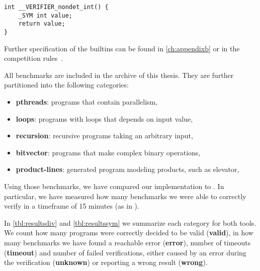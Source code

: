 \begin{verbatim}
int __VERIFIER_nondet_int() {
    _SYM int value;
    return value;
}
\end{verbatim}
Further specification of the \svcomp builtins can be found in
\autoref{ch:appendixb} or in the competition rules~\cite{svcomp}.

All benchmarks are included in the archive of this thesis. They are further
partitioned into the following categories:
\begin{itemize}
    \item \textbf{pthreads}: programs that contain parallelism,
    \item \textbf{loops}: programs with loops that depends on input value,
    \item \textbf{recursion}: recursive programs taking an arbitrary input,
    \item \textbf{bitvector}: programs that make complex binary operations,
    \item \textbf{product-lines}: generated program modeling products, such as
        elevator,
\end{itemize}

Using those benchmarks, we have compared our implementation to \SymDIVINE. In
particular, we have measured how many benchmarks we were able to correctly verify in a
timeframe of 15 minutes (as in \svcomp).

In \autoref{tbl:resultsdiv} and \autoref{tbl:resultssym} we summarize each
category for both tools. We count how many programs were correctly decided to be
valid (\textbf{valid}), in how many benchmarks we have found a reachable error
(\textbf{error}), number of timeouts (\textbf{timeout}) and number of failed
verifications, either caused by an error during the verification (\textbf{unknown})
or reporting a wrong result (\textbf{wrong}).


